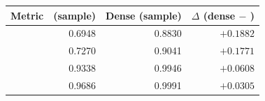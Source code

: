 \begin{tabular}{lrrr}
    \toprule
    Metric & \bmtwofive{} (sample) & Dense (sample) & $\Delta$ (dense $-$ \bmtwofive{}) \\
    \midrule
    \mrr{} & 0.6948 & 0.8830 & $+0.1882$ \\
    \ndcg{} & 0.7270 & 0.9041 & $+0.1771$ \\
    \recallH{} & 0.9338 & 0.9946 & $+0.0608$ \\
    \recallK{} & 0.9686 & 0.9991 & $+0.0305$ \\
    \bottomrule
\end{tabular}
